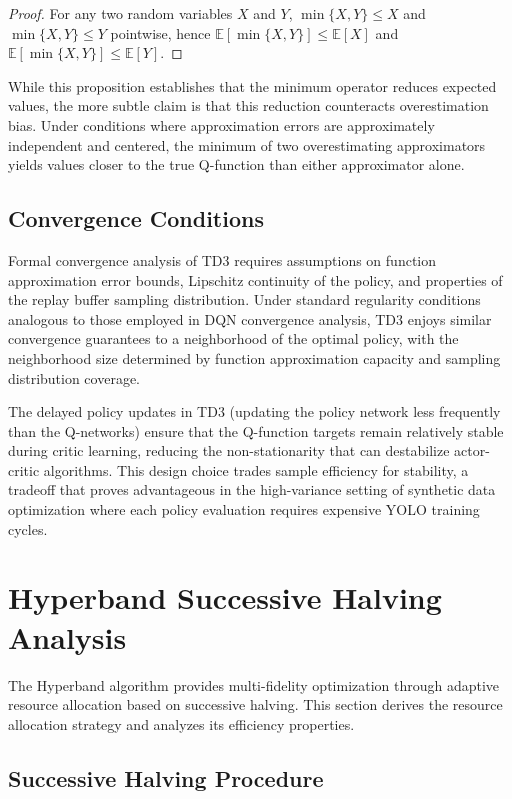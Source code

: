 \begin{proof}
For any two random variables $X$ and $Y$, $\min\{X, Y\} \leq X$ and $\min\{X, Y\} \leq Y$ pointwise, hence $\mathbb{E}[\min\{X, Y\}] \leq \mathbb{E}[X]$ and $\mathbb{E}[\min\{X, Y\}] \leq \mathbb{E}[Y]$.
\end{proof}

While this proposition establishes that the minimum operator reduces expected values, the more subtle claim is that this reduction counteracts overestimation bias. Under conditions where approximation errors are approximately independent and centered, the minimum of two overestimating approximators yields values closer to the true Q-function than either approximator alone.

\subsection{Convergence Conditions}

Formal convergence analysis of TD3 requires assumptions on function approximation error bounds, Lipschitz continuity of the policy, and properties of the replay buffer sampling distribution. Under standard regularity conditions analogous to those employed in DQN convergence analysis, TD3 enjoys similar convergence guarantees to a neighborhood of the optimal policy, with the neighborhood size determined by function approximation capacity and sampling distribution coverage.

The delayed policy updates in TD3 (updating the policy network less frequently than the Q-networks) ensure that the Q-function targets remain relatively stable during critic learning, reducing the non-stationarity that can destabilize actor-critic algorithms. This design choice trades sample efficiency for stability, a tradeoff that proves advantageous in the high-variance setting of synthetic data optimization where each policy evaluation requires expensive YOLO training cycles.

\section{Hyperband Successive Halving Analysis}
\label{sec:hyperband_analysis}

The Hyperband algorithm provides multi-fidelity optimization through adaptive resource allocation based on successive halving. This section derives the resource allocation strategy and analyzes its efficiency properties.

\subsection{Successive Halving Procedure}

